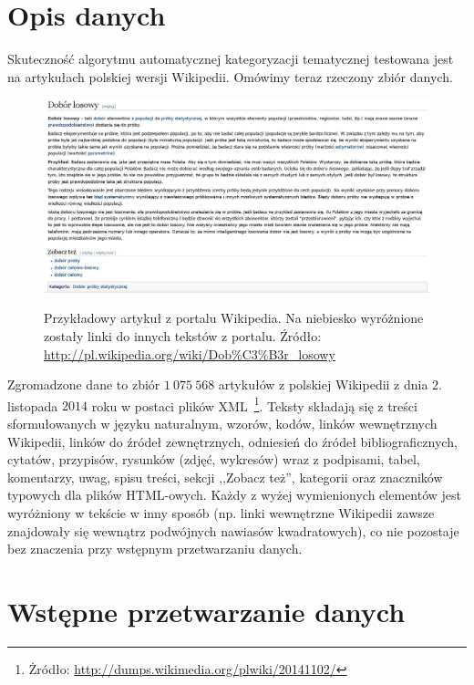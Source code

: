 \documentclass{praca1}
\begin{document}
\section{Opis danych}

Skuteczność algorytmu automatycznej kategoryzacji tematycznej testowana jest na artykułach polskiej wersji Wikipedii. Omówimy teraz rzeczony zbiór danych.

\begin{figure}[!h]
  \centering
  \includegraphics[width=450pt]{wiki2.jpg}\\
  \caption{Przykładowy artykuł z portalu Wikipedia. Na niebiesko wyróżnione zostały linki do innych tekstów z portalu. Źródło: \url{http://pl.wikipedia.org/wiki/Dob\%C3\%B3r\_losowy}}\label{wiki}
\end{figure}

Zgromadzone dane to zbiór $1\ 075\ 568$ artykułów z polskiej Wikipedii z dnia $2.$ listopada $2014$ roku w postaci plików XML~\footnote{Żródło: \url{http://dumps.wikimedia.org/plwiki/20141102/}}. Teksty składają się z treści sformułowanych w języku naturalnym, wzorów, kodów, linków wewnętrznych Wikipedii, linków do źródeł zewnętrznych, odniesień do źródeł bibliograficznych, cytatów, przypisów, rysunków (zdjęć, wykresów) wraz z podpisami, tabel, komentarzy, uwag, spisu treści, sekcji ,,Zobacz też'', kategorii oraz znaczników typowych dla plików HTML-owych. Każdy z wyżej wymienionych elementów jest wyróżniony w tekście w inny sposób (np. linki wewnętrzne Wikipedii zawsze znajdowały się wewnątrz podwójnych nawiasów kwadratowych), co nie pozostaje bez znaczenia przy wstępnym przetwarzaniu danych.

\section{Wstępne przetwarzanie danych}
\end{document}
